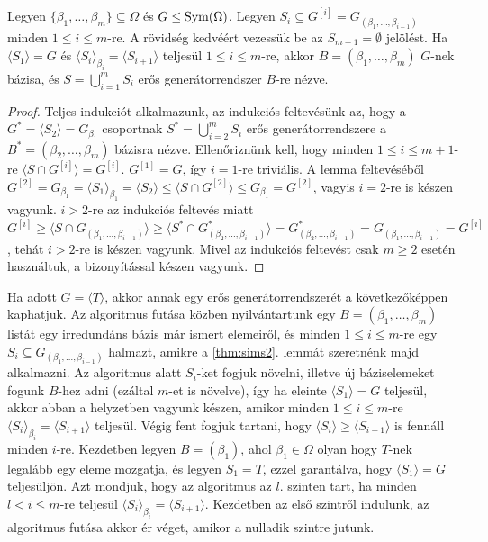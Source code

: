 \begin{lemma}
\label{thm:sims2}
Legyen $\{\beta_1, \dots, \beta_m\} \subseteq \Omega$ és $G \le \operatorname{Sym}(\Omega)$.
Legyen $S_i \subseteq G^{[i]} = G_{(\beta_1, \dots, \beta_{i-1})}$ minden $1 \le i \le m$-re.
A rövidség kedvéért vezessük be az $S_{m+1} = \emptyset$ jelölést.
Ha $\langle S_1 \rangle = G$ és $\langle S_i \rangle_{\beta_i} = \langle S_{i+1} \rangle$ teljesül $1 \le i \le m$-re, akkor $B = (\beta_1, \dots, \beta_m)$
$G$-nek bázisa, és $S = \bigcup_{i=1}^m S_i$ erős generátorrendszer $B$-re nézve.
\end{lemma}
\begin{proof}
Teljes indukciót alkalmazunk, az indukciós feltevésünk az, hogy a $G^{*} = \langle S_2 \rangle = G_{\beta_1}$ csoportnak $S^{*} = \bigcup_{i=2}^m S_i$ erős generátorrendszere a $B^{*} = (\beta_2, \dots, \beta_m)$ bázisra nézve.
Ellenőriznünk kell, hogy minden $1\le i \le m+1$-re $\langle S \cap G^{[i]} \rangle = G^{[i]}$.
$G^{[1]} = G$, így $i = 1$-re triviális.
A lemma feltevéséből $G^{[2]} = G_{\beta_1} = \langle S_1 \rangle_{\beta_1} = \langle S_2 \rangle \le \langle S \cap G^{[2]} \rangle \le G_{\beta_1} = G^{[2]}$, vagyis $i = 2$-re is készen vagyunk.
$i > 2$-re az indukciós feltevés miatt $G^{[i]} \ge \langle S \cap G_{(\beta_1, \dots, \beta_{i-1})} \rangle \ge \langle S^{*} \cap G^{*}_{(\beta_2, \dots, \beta_{i-1})} \rangle = G^{*}_{(\beta_2, \dots, \beta_{i-1})} = G_{(\beta_1, \dots, \beta_{i-1})} = G^{[i]}$,
tehát $i > 2$-re is készen vagyunk.
Mivel az indukciós feltevést csak $m \ge 2$ esetén használtuk, a bizonyítással készen vagyunk.
\end{proof}
Ha adott $G = \langle T \rangle$, akkor annak egy erős generátorrendszerét a következőképpen kaphatjuk.
Az algoritmus futása közben nyilvántartunk egy $B = (\beta_1, \dots, \beta_m)$ listát egy irredundáns bázis már ismert elemeiről,
és minden $1 \le i \le m$-re egy $S_i \subseteq G_{(\beta_1, \dots, \beta_{i-1})}$ halmazt, amikre a \ref{thm:sims2}. lemmát szeretnénk majd alkalmazni.
Az algoritmus alatt $S_i$-ket fogjuk növelni, illetve új báziselemeket fogunk $B$-hez adni (ezáltal $m$-et is növelve), így ha eleinte $\langle S_1 \rangle = G$ teljesül,
akkor abban a helyzetben vagyunk készen, amikor minden $1 \le i \le m$-re $\langle S_i \rangle_{\beta_i} = \langle S_{i+1} \rangle$ teljesül.
Végig fent fogjuk tartani, hogy $\langle S_i \rangle \ge \langle S_{i+1} \rangle$ is fennáll minden $i$-re.
Kezdetben legyen $B = (\beta_1)$, ahol $\beta_1 \in \Omega$ olyan hogy $T$-nek legalább egy eleme mozgatja, és legyen $S_1 = T$, ezzel garantálva, hogy $\langle S_1 \rangle = G$ teljesüljön.
Azt mondjuk, hogy az algoritmus az $l$. szinten tart, ha minden $l < i \le m$-re teljesül $\langle S_i \rangle_{\beta_i} = \langle S_{i+1} \rangle$.
Kezdetben az első szintről indulunk, az algoritmus futása akkor ér véget, amikor a nulladik szintre jutunk.


